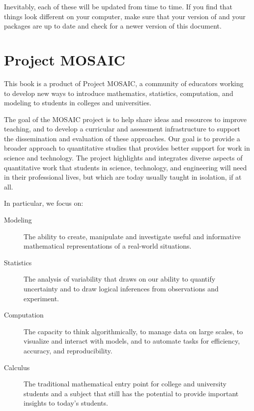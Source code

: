 \documentclass{tufte-book}\usepackage[]{graphicx}\usepackage[]{xcolor}
\begin{document}
Inevitably, each of these will be updated from time to time.
If you find that things look different on your computer, make sure that your 
version of \R{} and your packages are up to date and check for a newer version 
of this document.



\chapter*{Project MOSAIC}

This book is a product of
Project MOSAIC, a community of educators working to develop  new ways to
introduce mathematics, statistics, computation, and modeling to students in
colleges and universities.

\bigskip

The goal of the MOSAIC project is to help share ideas and resources to
improve teaching, and to develop a curricular and assessment
infrastructure to support the dissemination and evaluation of these approaches.
Our goal is to provide a broader approach to quantitative studies that provides
better support for work in science and technology. 
The project highlights and integrates
diverse aspects of quantitative work that students in science,
technology, and engineering will need in their professional lives, but which
are today usually taught in isolation, if at all.  

\vspace{.1in}

In particular, we focus on:
\begin{description}
	\item[Modeling] The ability to create, manipulate and investigate useful	and informative mathematical representations of a real-world situations.

	\item[Statistics] The analysis of variability that draws on our ability to	quantify uncertainty and to draw logical inferences from observations and experiment.

    \item[Computation] 
	The capacity to think algorithmically, to manage data on large scales, to	visualize and interact with models, and to automate tasks for efficiency, accuracy, and reproducibility.

    \item[Calculus] 
	The traditional mathematical entry point for college and university students and a subject that still has the potential to provide important insights to today's students.
	\end{description}
\end{document}
